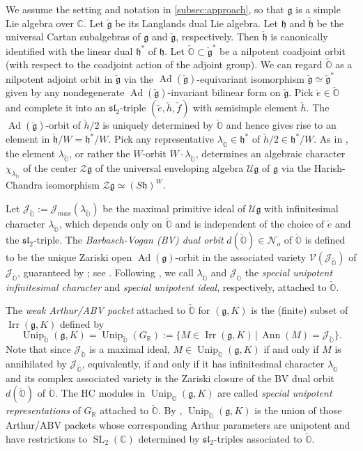 \documentclass[11pt, a4paper]{amsart}
\newcommand{\C}{\mathbb{C}}
\newcommand{\J}{\mathcal{J}}
\newcommand{\g}{\mathfrak{g}}
\newcommand{\orb}{\mathbb{O}}
\newcommand{\fg}{\mathfrak{g}}
\newcommand{\fh}{\mathfrak{h}}
\newcommand{\ckfg}{{\check{\fg}}}
\newcommand{\ckfh}{{\check{\fh}}}
\newcommand{\ckorb}{\check{\orb}}
\newcommand{\cN}{\mathcal{N}}
\newcommand{\cV}{\mathcal{V}}
\newcommand{\cZ}{\mathcal{Z}}
\newcommand{\cU}{\mathcal{U}}
\newcommand{\Ug}{\cU\fg}
\newcommand{\Zg}{\cZ\fg}
\DeclareMathOperator{\Ad}{Ad}
\DeclareMathOperator{\Ann}{Ann}
\DeclareMathOperator{\Unip}{Unip}
\newcommand{\UnipOv}{\Unip_{\ckorb}}
\newcommand{\SL}{\operatorname{SL}}
\newcommand{\R}{\mathbb{R}}
\newcommand{\GR}{G_\R}
\newcommand{\slf}{\mathfrak{sl}}
\newcommand{\Irr}{\operatorname{Irr}}
\theoremstyle{definition}
\numberwithin{equation}{section}
\begin{document}
We assume the setting and notation in \cref{subsec:approach}, so that $\fg$ is a simple Lie algebra over $\C$. Let $\ckfg$ be its Langlands dual Lie algebra. Let $\fh$ and $\ckfh$ be the universal Cartan subalgebras of $\fg$ and $\ckfg$, respectively. Then $\ckfh$ is canonically identified with the linear dual $\fh^*$ of $\fh$. Let $\ckorb \subset \ckfg^*$ be a nilpotent coadjoint orbit (with respect to the coadjoint action of the adjoint group). We can regard $\ckorb$ as a nilpotent adjoint orbit in $\ckfg$ via the $\Ad(\ckfg)$-equivariant isomorphism $\ckfg \simeq \ckfg^*$ given by any nondegenerate $\Ad(\ckfg)$-invariant bilinear form on $\ckfg$. Pick $\check{e} \in \ckorb$ and complete it into an $\slf_2$-triple $(\check{e}, \check{h}, \check{f})$ with semisimple element $\check{h}$. The $\Ad(\ckfg)$-orbit of $\check{h}/2$ is uniquely determined by $\ckorb$ and hence gives rise to an element in $\ckfh/W = \fh^*/W$. Pick any representative $\lambda_{\ckorb} \in \fh^*$ of $\check{h}/2 \in \fh^*/W$. As in \cite[Section 5]{BV85:unipotent}, the element $\lambda_{\ckorb}$, or rather the $W$-orbit $W \cdot \lambda_{\ckorb}$, determines an algebraic character $\chi_{\lambda_{\ckorb}}$ of the center $\Zg$ of the universal enveloping algebra $\Ug$ of $\fg$ via the Harish-Chandra isomorphism $\Zg \simeq (S\fh)^W$. 

Let $\J_{\ckorb} := \J_{max}(\lambda_{\ckorb})$ be the maximal primitive ideal of $\Ug$ with infinitesimal character $\lambda_{\ckorb}$, which depends only on $\ckorb$ and is independent of the choice of $\check{e}$ and the $\slf_2$-triple. The \emph{Barbasch-Vogan (BV) dual orbit} $d(\ckorb) \in \cN_o$ of $\ckorb$ is defined to be the unique Zariski open $\Ad(\fg)$-orbit in the associated variety $\cV(\J_{\ckorb})$ of $\J_{\ckorb}$, guaranteed by \cite[Theorem 3.10]{Joseph:associated_variety}; see \cite[Appendix]{BV85:unipotent}.
Following \cite{BV85:unipotent}, we call $\lambda_{\ckorb}$ and $\J_{\ckorb}$ the \emph{special unipotent infinitesimal character} and \emph{special unipotent ideal}, respectively, attached to $\ckorb$. 


The \emph{weak Arthur/ABV packet} attached to $\ckorb$ for $(\g,K)$ is the (finite) subset of $\Irr(\g,K)$ defined by
\begin{equation} \label{eq:UnipOv_defn}
	\UnipOv(\g, K) = \UnipOv(\GR) := \{M \in \Irr(\g,K) \,|\, \Ann(M) = \J_{\ckorb}\}.
\end{equation}
Note that since $\J_{\ckorb}$ is a maximal ideal, $M \in \UnipOv(\g, K)$ if and only if $M$ is annihilated by $\J_{\ckorb}$, equivalently, if and only if it has infinitesimal character $\lambda_{\ckorb}$ and its complex associated variety is the Zariski closure of the BV dual orbit $d(\ckorb)$ of $\ckorb$. The HC modules in $\UnipOv(\g, K)$ are called \emph{special unipotent representations} of $\GR$ attached to $\ckorb$. By \cite[Corollary 27.13]{ABV}, $\UnipOv(\g, K)$ is the union of those Arthur/ABV packets whose corresponding Arthur parameters are unipotent and have restrictions to $\SL_2(\C)$ determined by $\slf_2$-triples associated to $\ckorb$. 
\end{document}
